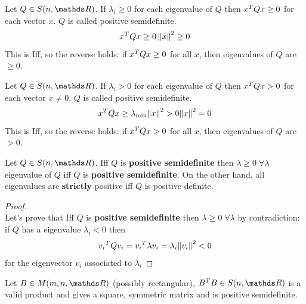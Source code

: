 \documentclass[computationalMathematics.tex]{subfiles}
\begin{document}
\begin{definition}
  Let $Q \in S(n, \R)$. If $\lambda_i \geq 0$ for each eigenvalue of $Q$ then ${x}^{T} Q x \ge 0$ for each vector $x$. $Q$ is called positive semidefinite.
  \[
    {x}^{T} Q x \ge 0\left\lVert x\right\rVert^2 \geq 0
  \]
  This is Iff, so the reverse holds: if ${x}^{T} Q x \ge 0$ for all $x$, then eigenvalues of $Q$ are $\geq 0$.
  \end{definition}

\begin{definition}
    Let $Q \in S(n, \R)$. If $\lambda_i > 0$ for each eigenvalue of $Q$ then ${x}^{T} Q x > 0$ for each vector $x \neq 0$. $Q$ is called positive semidefinite.
    \[
      {x}^{T} Q x \ge \lambda_{\text{min}} {\left\lVert x\right\rVert}^2 > 0 {\left\lVert x\right\rVert}^2 = 0
    \]
    This is Iff, so the reverse holds: if ${x}^{T} Q x > 0$ for all $x$, then eigenvalues of $Q$ are $> 0$.

\end{definition}

\begin{proposition}
  Let $Q \in S(n, \R)$. Iff $Q$ is \textbf{positive semidefinite} then $\lambda \ge 0 \; \forall \lambda$ eigenvalue of $Q$ iff $Q$ is \textbf{positive semidefinite}. On the other hand, all eigenvalues are \textbf{strictly} positive iff $Q$ is positive definite.
\end{proposition}

\begin{proof}~\\
Let's prove that Iff $Q$ is \textbf{positive semidefinite} then $\lambda \ge 0 \; \forall \lambda$ by contradiction:\\
if $Q$ has a eigenvalue $\lambda_i < 0$ then 
  \[
    {v_i}^{T}Qv_i = {v_i}^{T} \lambda v_i = \lambda_i {\left\lVert v_i\right\rVert}^2 < 0
  \]
for the eigenvector $v_i$ associated to $\lambda_i$
  

\end{proof}

\begin{proposition}
  Let $B \in M(m, n, \R)$ (possibly rectangular), $\tr{B} B \in S(n, \R)$ is a valid product
and gives a square, symmetric matrix and is positive semidefinite.
\end{proposition}
\end{document}
